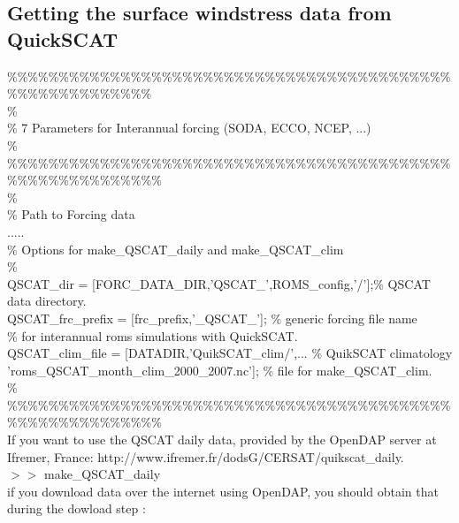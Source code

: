 \subsection{Getting the surface windstress data from QuickSCAT}
\%\%\%\%\%\%\%\%\%\%\%\%\%\%\%\%\%\%\%\%\%\%\%\%\%\%\%\%\%\%\%\%\%\%\%\%\%\%\%\%\%\%\%\%\%\%\%\%\%\%\%\%\%\%\%\%\%\\
\%\\
\% 7 Parameters for Interannual forcing (SODA, ECCO, NCEP, ...)\\
\%\\
\%\%\%\%\%\%\%\%\%\%\%\%\%\%\%\%\%\%\%\%\%\%\%\%\%\%\%\%\%\%\%\%\%\%\%\%\%\%\%\%\%\%\%\%\%\%\%\%\%\%\%\%\%\%\%\%\%\%\\
\%\\
\% Path to Forcing data\\
.....\\
\%  Options for make\_QSCAT\_daily and make\_QSCAT\_clim\\
\%\\
QSCAT\_dir        = [FORC\_DATA\_DIR,'QSCAT\_',ROMS\_config,'/'];\% QSCAT data directory.\\
QSCAT\_frc\_prefix = [frc\_prefix,'\_QSCAT\_'];                  \% generic forcing file name\\
                                                                 \% for interannual roms simulations with QuickSCAT.\\
QSCAT\_clim\_file  = [DATADIR,'QuikSCAT\_clim/',...              \% QuikSCAT climatology\\
                    'roms\_QSCAT\_month\_clim\_2000\_2007.nc'];       \% file for make\_QSCAT\_clim.\\
\%\\
\%\%\%\%\%\%\%\%\%\%\%\%\%\%\%\%\%\%\%\%\%\%\%\%\%\%\%\%\%\%\%\%\%\%\%\%\%\%\%\%\%\%\%\%\%\%\%\%\%\%\%\%\%\%\%\%\%\%\\

If you want to use the QSCAT daily data, provided by the OpenDAP server at Ifremer,
France: http://www.ifremer.fr/dodsG/CERSAT/quikscat\_daily. \\

$>>$ make\_QSCAT\_daily \\

if you download data over the internet using OpenDAP, you should obtain that during
the dowload step : 

